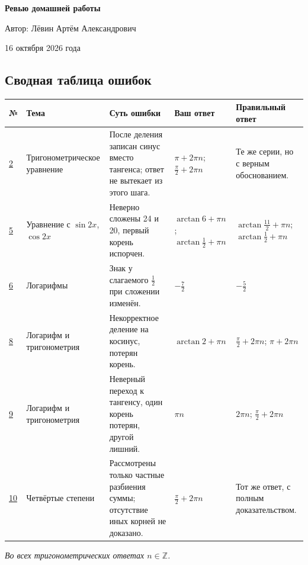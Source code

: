 \documentclass[12pt,a4paper]{article}
\begin{document}
\begin{titlepage}
\thispagestyle{empty}
\vspace*{58mm}
\begin{center}
{\Huge\bfseries Ревью домашней работы\par}
\vspace{25mm}
{\large Автор: Лёвин Артём Александрович\par}
\vspace{7mm}
{\large 16 октября 2026 года\par}
\end{center}
\vfill
\begin{center}
\end{center}
\end{titlepage}

\newpage
\begin{landscape}
\section*{Сводная таблица ошибок}
\small
\setlength{\tabcolsep}{3pt}
\renewcommand{\arraystretch}{1.4}
\begin{longtable}{@{}p{.055\linewidth}p{.15\linewidth}p{.26\linewidth}p{.22\linewidth}p{.235\linewidth}@{}}
\toprule
\textbf{№} & \textbf{Тема} & \textbf{Суть ошибки} & \textbf{Ваш ответ} & \textbf{Правильный ответ}\\
\midrule
\endhead
\hyperref[task:2]{2} & Тригонометрическое уравнение & После деления записан синус вместо тангенса; ответ не вытекает из этого шага. & $\pi+2\pi n$; $\frac\pi2+2\pi n$ & Те же серии, но с верным обоснованием.\\
\hyperref[task:5]{5} & Уравнение с $\sin2x$, $\cos2x$ & Неверно сложены 24 и 20, первый корень испорчен. & $\arctan 6+\pi n$; $\arctan\frac12+\pi n$ & $\arctan\frac{11}{2}+\pi n$; $\arctan\frac12+\pi n$\\
\hyperref[task:6]{6} & Логарифмы & Знак у слагаемого $\frac12$ при сложении изменён. & $-\frac72$ & $-\frac52$\\
\hyperref[task:8]{8} & Логарифм и тригонометрия & Некорректное деление на косинус, потерян корень. & $\arctan2+\pi n$ & $\frac\pi2+2\pi n$; $\pi+2\pi n$\\
\hyperref[task:9]{9} & Логарифм и тригонометрия & Неверный переход к тангенсу, один корень потерян, другой лишний. & $\pi n$ & $2\pi n$; $\frac\pi2+2\pi n$\\
\hyperref[task:10]{10} & Четвёртые степени & Рассмотрены только частные разбиения суммы; отсутствие иных корней не доказано. & $\frac\pi2+2\pi n$ & Тот же ответ, с полным доказательством.\\
\bottomrule
\end{longtable}
\normalsize
\textit{Во всех тригонометрических ответах $n\in\mathbb Z$.}
\end{landscape}
\end{document}
